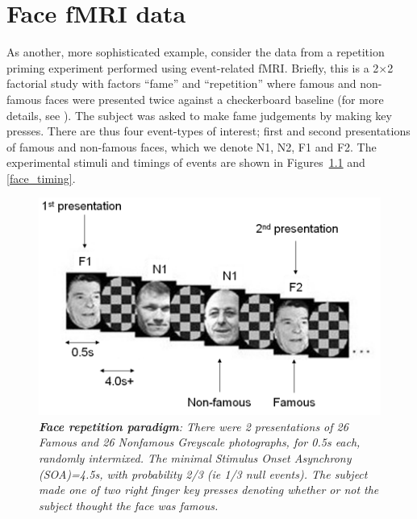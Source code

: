 \chapter{Face fMRI data \label{Chap:data:faces}}

As another, more sophisticated example, consider the data from a repetition priming experiment performed using event-related fMRI.
Briefly, this is a 2$\times$2 factorial study with factors ``fame'' and ``repetition'' where famous and non-famous faces were presented twice against a checkerboard baseline (for more details, see \cite{rnah_face_rep}). The subject was asked to make fame judgements by making key presses. There are thus four event-types of interest; first and second presentations of famous and non-famous faces, which we denote N1, N2, F1 and F2. The experimental stimuli and timings of events are shown in Figures~\ref{face_stim} and \ref{face_timing}.

\begin{figure}
\begin{center}
\includegraphics[width=120mm]{faces/face_stim}
\caption{\em \textbf{Face repetition paradigm}: There were 2 presentations of 26 Famous and 26 Nonfamous Greyscale photographs, for 0.5s each, randomly intermixed. The minimal Stimulus Onset Asynchrony (SOA)=4.5s, with probability 2/3 (ie 1/3 null events). The subject made one of two right finger key presses denoting whether or not the subject thought the face was famous. \label{face_stim}}
\end{center}
\end{figure}

